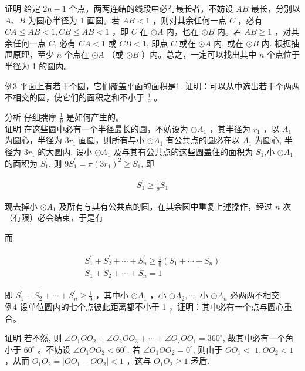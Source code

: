 \documentclass[10pt]{article}
\begin{document}
证明 给定 $2 n-1$ 个点，两两连结的线段中必有最长者，不妨设 $A B$ 最长，分别以 $A 、 B$ 为圆心半径为 1 画圆。若 $A B<1$ ，则对其余任何一点 $C$ ，必有 $C A \leqslant A B<1, C B \leqslant A B<1$ ，即 $C$ 在 $\odot A$ 内，也在 $\odot B$ 内。若 $A B \geqslant 1$ ，对其余任何一点 $C$, 必有 $C A<1$ 或 $C B<1$, 即点 $C$ 或在 $\odot A$ 内, 或在 $\odot B$ 内. 根据抽屉原理，至少 $n$ 个点在 $\odot A$ （或 $\odot B$ ）内。总之，一定可以找出其中 $n$ 个点位于半径为 1 的圆内。

例3 平面上有若干个圆，它们覆盖平面的面积是1. 证明：可以从中选出若干个两两不相交的圆，使它们的面积之和不小于 $\frac{1}{9}$ 。

分析 仔细揣摩 $\frac{1}{9}$ 是如何产生的。\\
证明 在这些圆中必有一个半径最长的圆，不妨设为 $\odot A_{1}$ ，其半径为 $r_{1}$ ，以 $A_{1}$ 为圆心，半径为 $3 r_{1}$ 画圆，则所有与小 $\odot A_{1}$ 有公共点的圆必在以 $A_{1}$ 为圆心, 半径为 $3 r_{1}$ 的大圆内. 设小 $\odot A_{1}$ 及与其有公共点的这些圆盖住的面积为 $S_{1}$,小 $\odot A_{1}$ 的面积为 $S_{1}^{\prime}$, 则 $9 S_{1}^{\prime}=\pi\left(3 r_{1}\right)^{2} \geqslant S_{1}$, 即

\begin{align*}
S_{1}^{\prime} \geqslant \frac{1}{9} S_{1}
\end{align*}

现去掉小 $\odot A_{1}$ 及所有与其有公共点的圆，在其余圆中重复上述操作，经过 $n$ 次（有限）必会结束，于是有

而

\begin{align*}
\begin{gathered}
S_{1}^{\prime}+S_{2}^{\prime}+\cdots+S_{n}^{\prime} \geqslant \frac{1}{9}\left(S_{1}+\cdots+S_{n}\right) \\
S_{1}+S_{2}+\cdots+S_{n}=1
\end{gathered}
\end{align*}

即 $S_{1}^{\prime}+S_{2}^{\prime}+\cdots+S_{n}^{\prime} \geqslant \frac{1}{9}$ ，其中小 $\odot A_{1}$ ，小 $\odot A_{2}, \cdots$, 小 $\odot A_{n}$ 必两两不相交.\\
例4 设单位圆内的七个点彼此距离都不小于 1 ，证明：其中必有一个点与圆心重合。

证明 若不然, 则 $\angle O_{1} O O_{2}+\angle O_{2} O O_{3}+\cdots+\angle O_{7} O O_{1}=360^{\circ}$, 故其中必有一个角小于 $60^{\circ}$ 。不妨设 $\angle O_{1} O O_{2}<60^{\circ}$. 若 $\angle O_{1} O O_{2}=0^{\circ}$, 则由于 $O O_{1}<$ $1, O O_{2}<1$ ，从而 $O_{1} O_{2}=\left|O O_{1}-O O_{2}\right|<1$ ，这与 $O_{1} O_{2} \geqslant 1$ 矛盾.
\end{document}
